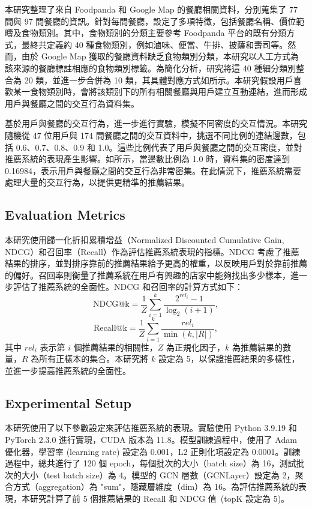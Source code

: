         本研究整理了來自 Foodpanda 和 Google Map 的餐廳相關資料，分別蒐集了 77 間與 97 間餐廳的資訊。針對每間餐廳，設定了多項特徵，包括餐廳名稱、價位範疇及食物類別。其中，食物類別的分類主要參考 Foodpanda 平台的既有分類方式，最終共定義約 40 種食物類別，例如滷味、便當、牛排、披薩和壽司等。然而，由於 Google Map 獲取的餐廳資料缺乏食物類別分類，本研究以人工方式為該來源的餐廳標註相應的食物類別標籤。為簡化分析，研究將這 40 種細分類別整合為 20 類，並進一步合併為 10 類，其具體對應方式如所示。本研究假設用戶喜歡某一食物類別時，會將該類別下的所有相關餐廳與用戶建立互動連結，進而形成用戶與餐廳之間的交互行為資料集。

        基於用戶與餐廳的交互行為，進一步進行實驗，模擬不同密度的交互情況。本研究隨機從 47 位用戶與 174 間餐廳之間的交互資料中，挑選不同比例的連結邊數，包括 0.6、0.7、0.8、0.9 和 1.0。這些比例代表了用戶與餐廳之間的交互密度，並對推薦系統的表現產生影響。如所示，當邊數比例為 1.0 時，資料集的密度達到 0.16984，表示用戶與餐廳之間的交互行為非常密集。在此情況下，推薦系統需要處理大量的交互行為，以提供更精準的推薦結果。
        
    \subsection{Evaluation Metrics}
    本研究使用歸一化折扣累積增益（Normalized Discounted Cumulative Gain, NDCG）和召回率（Recall）作為評估推薦系統表現的指標。NDCG 考慮了推薦結果的排序，並對排序靠前的推薦結果給予更高的權重，以反映用戶對於靠前推薦的偏好。召回率則衡量了推薦系統在用戶有興趣的店家中能夠找出多少樣本，進一步評估了推薦系統的全面性。NDCG 和召回率的計算方式如下：
    \begin{equation}
        \text{NDCG@k} = \frac{1}{Z} \sum_{i=1}^{k} \frac{2^{rel_i} - 1}{\log_2(i+1)},
    \end{equation}
    \begin{equation}
        \text{Recall@k} = \frac{1}{Z} \sum_{i=1}^{k} \frac{rel_i}{\min(k, |R|)},
    \end{equation}
    其中 \(rel_i\) 表示第 \(i\) 個推薦結果的相關性，\(Z\) 為正規化因子，\(k\) 為推薦結果的數量，\(R\) 為所有正樣本的集合。本研究將 \(k\) 設定為 5，以保證推薦結果的多樣性，並進一步提高推薦系統的全面性。

    \subsection{Experimental Setup}
    本研究使用了以下參數設定來評估推薦系統的表現。實驗使用 Python 3.9.19 和 PyTorch 2.3.0 進行實現，CUDA 版本為 11.8。模型訓練過程中，使用了 Adam 優化器，學習率 (learning rate) 設定為 0.001，L2 正則化項設定為 0.0001。訓練過程中，總共進行了 120 個 epoch，每個批次的大小（batch size）為 16，測試批次的大小（test batch size）為 4。模型的 GCN 層數（GCNLayer）設定為 2，聚合方式（aggregation）為 "sum"，隱藏層維度（dim）為 16。為評估推薦系統的表現，本研究計算了前 5 個推薦結果的 Recall 和 NDCG 值~(topK 設定為 5)。


